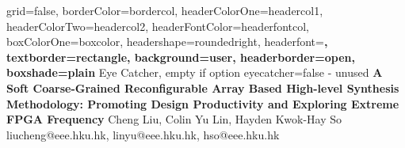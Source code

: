 \documentclass[a0paper,portrait]{baposter}
\begin{document}
\begin{poster}{
	grid=false,
	borderColor=bordercol,
	headerColorOne=headercol1,
	headerColorTwo=headercol2,
	headerFontColor=headerfontcol,
	boxColorOne=boxcolor,
	headershape=roundedright,
	headerfont=\Large\sf\bf,
	textborder=rectangle,
	background=user,
	headerborder=open,
  boxshade=plain
}
{
	Eye Catcher, empty if option eyecatcher=false - unused
}
{\sf\bf
A Soft Coarse-Grained Reconfigurable Array Based High-level Synthesis Methodology: Promoting Design 
Productivity and Exploring Extreme FPGA Frequency
}
{
	\vspace{1em} Cheng Liu, Colin Yu Lin, Hayden Kwok-Hay So\\
	{\smaller liucheng@eee.hku.hk, linyu@eee.hku.hk, hso@eee.hku.hk}
}
{
\setlength\fboxsep{0pt}
\setlength\fboxrule{0pt}
}


\end{poster}
\end{document}
